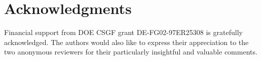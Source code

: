 \section*{Acknowledgments}

Financial support from DOE CSGF grant DE-FG02-97ER25308 is gratefully acknowledged.
The authors would also like to express their appreciation to the two anonymous
reviewers for their particularly insightful and valuable comments.